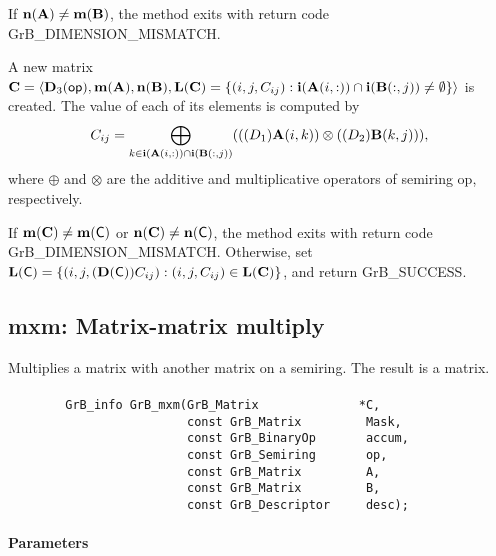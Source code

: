 {If $\bold{n}({\bf A}) \neq \bold{m}({\bf B})$, the method exits with return code {\sf GrB\_DIMENSION\_MISMATCH}.

A new matrix ${\bf C} = \langle \bold{D}_3({\sf op}),
\bold{m}({\bf A}), \bold{n}({\bf B}), \bold{L}({\bf C}) =
\{(i,j,C_{ij}) : {\bf i}({\bf A}(i,:)) \cap
{\bf i}({\bf B}(:,j)) \neq \emptyset \} \rangle$ is created.
The value of each of its elements is computed by 
\[ 
C_{ij} = \bigoplus_{k
\in {\bf i}({\bf A}(i,:)) \cap {\bf i}({\bf B}(:,j))}
(((D_1){\bf A}(i,k)) \otimes ((D_2){\bf B}(k,j))),
\]
where $\oplus$
and $\otimes$ are the additive and multiplicative operators of
semiring {\sf op}, respectively.  

If $\bold{m}({\bf C}) \neq \bold{m}({\sf C})$ or $\bold{n}({\bf C}) \neq \bold{n}({\sf C})$,
the method exits with return code {\sf GrB\_DIMENSION\_MISMATCH}.
Otherwise, set $\bold{L}({\sf C}) = \{(i,j,(\bold{D}({\sf C}))C_{ij}) : (i,j,C_{ij}) \in \bold{L}({\bf C}) \}$, and return {\sf GrB\_SUCCESS}.

}
\raggedbottom
\pagebreak
\subsection{{\sf mxm}: Matrix-matrix multiply}

Multiplies a matrix with another matrix on a semiring. The result is a matrix.

\paragraph{\syntax}

\begin{verbatim}
        GrB_info GrB_mxm(GrB_Matrix              *C,
                         const GrB_Matrix         Mask,
                         const GrB_BinaryOp       accum,
                         const GrB_Semiring       op,
                         const GrB_Matrix         A, 
                         const GrB_Matrix         B,
                         const GrB_Descriptor     desc);
\end{verbatim}

\paragraph{Parameters}


